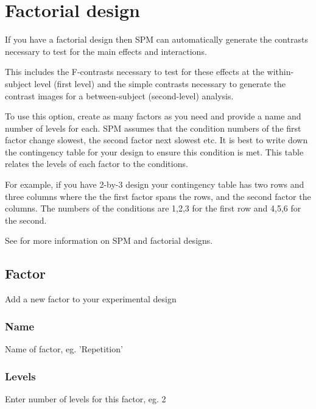 \documentclass[a4paper,titlepage]{book}
\begin{document}
\section{Factorial design}
If you have a factorial design then SPM can automatically generate the contrasts necessary to test for the main effects and interactions. 

                                                                                                            

This includes the F-contrasts necessary to test for these effects at the within-subject level (first level) and the simple contrasts necessary to generate the contrast images for a between-subject (second-level) analysis.

                                                                                                            

To use this option, create as many factors as you need and provide a name and number of levels for each.  SPM assumes that the condition numbers of the first factor change slowest, the second factor next slowest etc. It is best to write down the contingency table for your design to ensure this condition is met. This table relates the levels of each factor to the conditions. 

                                                                                                            

For example, if you have 2-by-3 design  your contingency table has two rows and three columns where the the first factor spans the rows, and the second factor the columns. The numbers of the conditions are 1,2,3 for the first row and 4,5,6 for the second. 

See \cite{rnah_anova} for more information on SPM and factorial designs.

\subsection{Factor}
Add a new factor to your experimental design


\subsubsection{Name}
Name of factor, eg. 'Repetition' 


\subsubsection{Levels}
Enter number of levels for this factor, eg. 2
\end{document}
